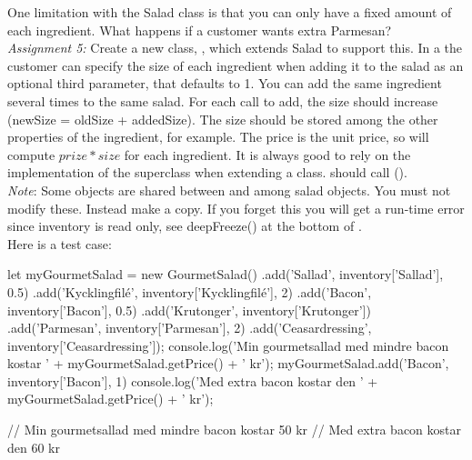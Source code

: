 \documentclass[fleqn, article, a4paper]{memoir}
\begin{document}
\begin{Assignments}
\item One limitation with the Salad class is that you can only have a fixed amount of each ingredient. What happens if a customer wants extra Parmesan?
\\\emph{Assignment 5:} 
Create a new class, , which extends Salad to support this. In a  the customer can specify the size of each ingredient when adding it to the salad as an optional third parameter, that defaults to 1. You can add the same ingredient several times to the same salad. For each call to add, the size should increase (newSize = oldSize + addedSize). The size should be stored among the other properties of the ingredient, for example. The price is the unit price, so  will compute $prize*size$ for each ingredient.
It is always good to rely on the implementation of the superclass when extending a class.  should call  ().
\\\emph{Note}: Some objects are shared between  and among salad objects. You must not modify these. Instead make a copy. If you forget this you will get a run-time error since inventory is read only, see deepFreeze() at the bottom of .
\\ Here is a test case:
\begin{Code}
let myGourmetSalad = new GourmetSalad()
.add('Sallad', inventory['Sallad'], 0.5)
.add('Kycklingfilé', inventory['Kycklingfilé'], 2)
.add('Bacon', inventory['Bacon'], 0.5)
.add('Krutonger', inventory['Krutonger'])
.add('Parmesan', inventory['Parmesan'], 2)
.add('Ceasardressing', inventory['Ceasardressing']);
console.log('Min gourmetsallad med mindre bacon kostar '
    + myGourmetSalad.getPrice() + ' kr');
myGourmetSalad.add('Bacon', inventory['Bacon'], 1)
console.log('Med extra bacon kostar den '
    + myGourmetSalad.getPrice() + ' kr');

// Min gourmetsallad med mindre bacon kostar 50 kr
// Med extra bacon kostar den 60 kr
\end{Code}


\end{Assignments}
\end{document}
